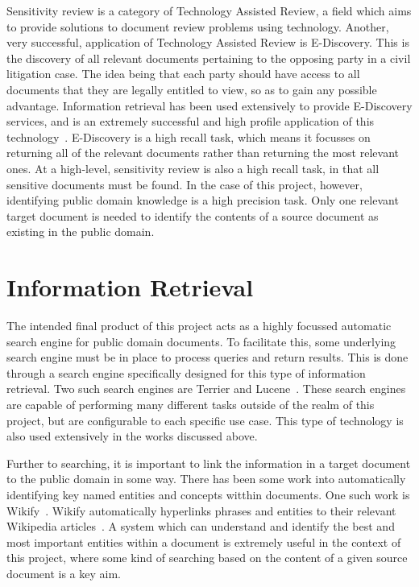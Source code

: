 \documentclass{l4proj}
\begin{document}
Sensitivity review is a category of Technology Assisted Review, a field which aims to provide solutions to document review problems using technology. Another, very successful, application of Technology Assisted Review is E-Discovery. This is the discovery of all relevant documents pertaining to the opposing party in a civil litigation case. The idea being that each party should have access to all documents that they are legally entitled to view, so as to gain any possible advantage. Information retrieval has been used extensively to provide E-Discovery services, and is an extremely successful and high profile application of this technology~\cite{oard2013information}. E-Discovery is a high recall task, which means it focusses on returning all of the relevant documents rather than returning the most relevant ones. At a high-level, sensitivity review is also a high recall task, in that all sensitive documents must be found. In the case of this project, however, identifying public domain knowledge is a high precision task. Only one relevant target document is needed to identify the contents of a source document as existing in the public domain.
\section{Information Retrieval}
The intended final product of this project acts as a highly focussed automatic search engine for public domain documents. To facilitate this, some underlying search engine must be in place to process queries and return results. This is done through a search engine specifically designed for this type of information retrieval. Two such search engines are Terrier and Lucene~\cite{macdonald2012puppy, terrier, lucene}. These search engines are capable of performing many different tasks outside of the realm of this project, but are configurable to each specific use case. This type of technology is also used extensively in the works discussed above.

Further to searching, it is important to link the information in a target document to the public domain in some way.
There has been some work into automatically identifying key named entities and concepts witthin documents. One such work is Wikify~\cite{Mihalcea:2007:WLD:1321440.1321475}. Wikify automatically hyperlinks phrases and entities to their relevant Wikipedia articles~\cite{wikipedia}. A system which can understand and identify the best and most important entities within a document is extremely useful in the context of this project, where some kind of searching based on the content of a given source document is a key aim.
\end{document}
